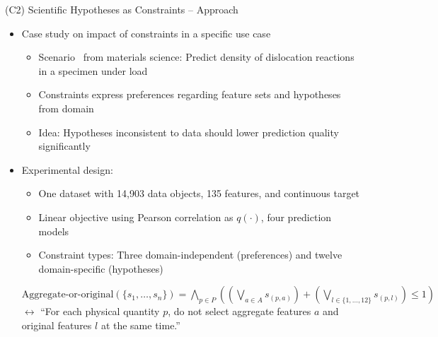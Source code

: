 \documentclass[en, navbarinline, handout]{sdqbeamer}
\begin{document}
\begin{frame}[t]{(C2) Scientific Hypotheses as Constraints -- Approach}
	\begin{itemize}
		\item Case study on impact of constraints in a specific use case
		\begin{itemize}
			\item Scenario~\cite{sudmanns2020data} from materials science: Predict density of dislocation reactions in a specimen under load
			\item Constraints express preferences regarding feature sets and hypotheses from domain
			\item Idea: Hypotheses inconsistent to data should lower prediction quality significantly
		\end{itemize}
		\vspace{\baselineskip}
		\item Experimental design:
		\begin{itemize}
			\item One dataset with 14,903 data objects, 135 features, and continuous target
			\item Linear objective using Pearson correlation as $q(\cdot)$, four prediction models
			\item Constraint types: Three domain-independent (preferences) and twelve domain-specific (hypotheses)
		\end{itemize}
		\vspace{0.5\baselineskip}
		\begin{example}
			$\text{Aggregate-or-original}(\{s_1, \dots, s_n\}) = \bigwedge_{p \in P} \left( \left( \bigvee_{a \in A} s_{(p,a)} \right) + \left( \bigvee_{l \in \{1, \dots, 12\}} s_{(p,l)} \right) \leq 1 \right)$\\
			$\leftrightarrow$ ``For each physical quantity $p$, do not select aggregate features $a$ and original features $l$ at the same time.'' %
		\end{example}
	\end{itemize}
\end{frame}
\end{document}
